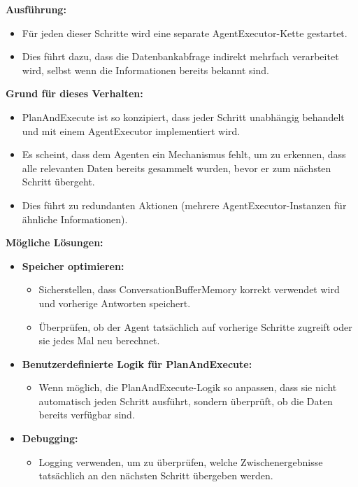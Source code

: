 \textbf{Ausführung:}
\begin{itemize}
    \item Für jeden dieser Schritte wird eine separate AgentExecutor-Kette gestartet.
    \item Dies führt dazu, dass die Datenbankabfrage indirekt mehrfach verarbeitet wird, selbst wenn die Informationen bereits bekannt sind.
\end{itemize}

\textbf{Grund für dieses Verhalten:}
\begin{itemize}
    \item PlanAndExecute ist so konzipiert, dass jeder Schritt unabhängig behandelt und mit einem AgentExecutor implementiert wird.
    \item Es scheint, dass dem Agenten ein Mechanismus fehlt, um zu erkennen, dass alle relevanten Daten bereits gesammelt wurden, bevor er zum nächsten Schritt übergeht.
    \item Dies führt zu redundanten Aktionen (mehrere AgentExecutor-Instanzen für ähnliche Informationen).
\end{itemize}

\textbf{Mögliche Lösungen:}
\begin{itemize}
    \item \textbf{Speicher optimieren:}
    \begin{itemize}
        \item Sicherstellen, dass ConversationBufferMemory korrekt verwendet wird und vorherige Antworten speichert.
        \item Überprüfen, ob der Agent tatsächlich auf vorherige Schritte zugreift oder sie jedes Mal neu berechnet.
    \end{itemize}
    \item \textbf{Benutzerdefinierte Logik für PlanAndExecute:}
    \begin{itemize}
        \item Wenn möglich, die PlanAndExecute-Logik so anpassen, dass sie nicht automatisch jeden Schritt ausführt, sondern überprüft, ob die Daten bereits verfügbar sind.
    \end{itemize}
    \item \textbf{Debugging:}
    \begin{itemize}
        \item Logging verwenden, um zu überprüfen, welche Zwischenergebnisse tatsächlich an den nächsten Schritt übergeben werden.
    \end{itemize}
\end{itemize}